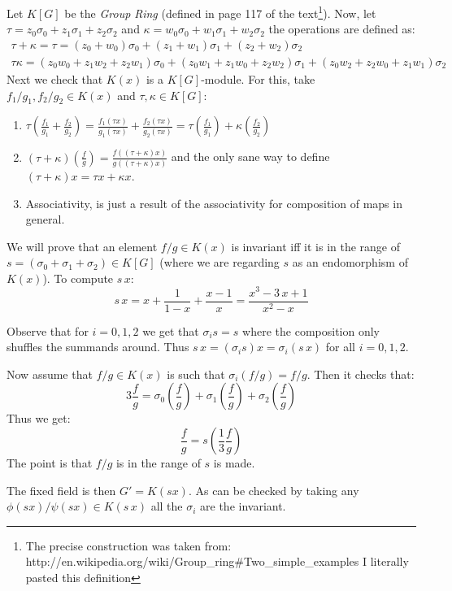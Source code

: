 Let $K[G]$ be the \emph{Group Ring} (defined in page 117 of the text\footnote{The precise construction was taken from: http://en.wikipedia.org/wiki/Group\_ring\#Two\_simple\_examples I literally pasted this definition}). 
Now, let $\tau = z_0\sigma_0 + z_1\sigma_1 + z_2\sigma_2$ and $\kappa = w_0\sigma_0 + w_1\sigma_1 + w_2\sigma_2$ the operations are defined as:
\begin{gather*}
    \tau+\kappa = \tau = (z_0 + w_0)\sigma_0 + (z_1+w_1)\sigma_1 + (z_2+w_2)\sigma_2\\
   \tau\kappa=(z_0w_0 + z_1w_2 + z_2w_1)\sigma_0+(z_0w_1 + z_1w_0 + z_2w_2)\sigma_1+(z_0w_2 + z_2w_0 + z_1w_1)\sigma_2
\end{gather*}
Next we check that $K(x)$ is a $K[G]$-module. For this, take $f_1/g_1, f_2/g_2\in K(x)$ and $\tau,\kappa\in K[G]$:
\begin{enumerate}
    \item $\tau\left( \frac{f_1}{g_1}+\frac{f_2}{g_2}\right)= \frac{f_1(\tau x)}{g_1(\tau x)}+\frac{f_2(\tau x)}{g_2(\tau x)}=\tau\left( \frac{f_1}{g_1}\right) +\kappa\left(\frac{f_2}{g_2}\right)$
    \item $(\tau+\kappa)\left( \frac fg \right) = \frac{f((\tau+\kappa)x)}{g((\tau+\kappa)x)}$ and the only sane way to define $(\tau+\kappa)x=\tau x+ \kappa x$.
    \item Associativity, is just a result of the associativity for composition of maps in general.
\end{enumerate}

We will prove that an element $f/g\in K(x)$ is invariant iff it is in the range of $s=(\sigma_0+\sigma_1+\sigma_2)\in K[G]$ (where we are regarding $s$ as an endomorphism of $K(x)$). 
To compute $s\,x$:
$$s\,x = x + \frac 1{1-x} + \frac {x-1}{x}= \frac{x^{3} - 3 \, x + 1}{x^{2} - x}$$ 

Observe that for  $i=0,1,2$ we get that $\sigma_i s = s$ where the composition only shuffles the summands around. Thus $s\,x = (\sigma_i s)x = \sigma_i (s \,x)$ for all $i=0,1,2$.

Now assume that $f/g\in K(x)$ is such that $\sigma_i(f/g)=f/g$. Then it checks that:
$$3\frac fg = \sigma_0\left(\frac fg\right) + \sigma_1\left(\frac fg\right) + \sigma_2\left(\frac fg\right)$$
Thus we get:
$$\frac fg = s\left(\frac 13  \frac fg\right)$$
 The point is that $f/g$ is in the range of $s$ is made. 

 The fixed field is then $G'=K(sx)$. As can be checked by taking any $\phi(sx)/\psi(sx)\in K(s\,x)$ all the $\sigma_i$ are the invariant.

